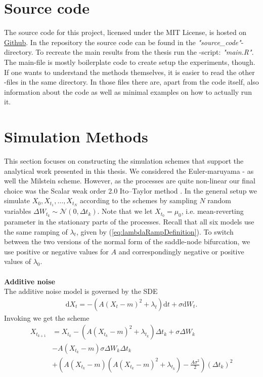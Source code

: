 \section{Source code}
The source code for this project, licensed under the MIT License, is hosted on \href{https://github.com/Gantzhorn/Thesis}{Github}. In the repository the source code can be found in the \textit{"source\_code"}-directory. To recreate the main results from the thesis run the -script: \textit{"main.R"}. The main-file is mostly boilerplate code to create setup the experiments, though. If one wants to understand the methods themselves, it is easier to read the other -files in the same directory. In those files there are, apart from the code itself, also information about the code as well as minimal examples on how to actually run it. 
\section{Simulation Methods}\label{appendix:simMethods}
This section focuses on constructing the simulation schemes that support the analytical work presented in this thesis. We considered the Euler-maruyama - as well the Milstein scheme. However, as the processes are quite non-linear our final choice was the Scalar weak order 2.0 Ito–Taylor method \cite[algorithm 8.5]{Srkk2019}. In the general setup we simulate $X_0,X_{t_1},\dots, X_{t_N}$ according to the schemes by sampling $N$ random variables $\Delta W_{t_k}\sim\mathcal{N}\left(0, \Delta t_k\right)$. Note that we let $X_{t_0} = \mu_0$, i.e. mean-reverting parameter in the stationary parts of the processes. Recall that all six models use the same ramping of $\lambda_t$, given by (\ref{eq:lambdaRampDefinition}). To switch between the two versions of the normal form of the saddle-node bifurcation, we use positive or negative values for $A$ and correspondingly negative or positive values of $\lambda_0$. \\\\
\noindent \textbf{Additive noise}\\
The additive noise model is governed by the SDE
\begin{align}
    \mathrm{d}X_t = -\left(A(X_t - m)^2 + \lambda_t\right)\mathrm{d}t + \sigma \mathrm{d}W_t.
\end{align}
Invoking \cite[algorithm 8.5]{Srkk2019} we get the scheme
\begin{align}
    X_{t_{k + 1}} &= X_{t_k} - \left(A(X_{t_k} - m)^2 + \lambda_{t_k}\right) \Delta t_k + \sigma \Delta W_{k} \nonumber \\&-  A \left(X_{t_k} - m\right)\sigma \Delta W_k \Delta t_k\nonumber \\
    & + \left(A\left(X_{t_k} - m\right)\left(A\left(X_{t_k} - m\right)^2 + \lambda_{t_k}\right) - \frac{A \sigma^2}{2}\right)\left(\Delta t_k\right)^2 \label{eq:OUSim}
\end{align}
